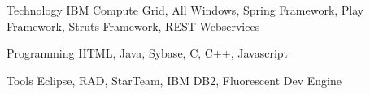 

\begin{cvskills}

  \cvskill
    {Technology} %
    {IBM Compute Grid, All Windows, Spring Framework, Play Framework, Struts Framework, REST Webservices} %

  \cvskill
    {Programming} %
    {HTML, Java, Sybase, C, C++, Javascript} %

  \cvskill
    {Tools} %
    {Eclipse, RAD, StarTeam, IBM DB2, Fluorescent Dev Engine} %

\end{cvskills}

